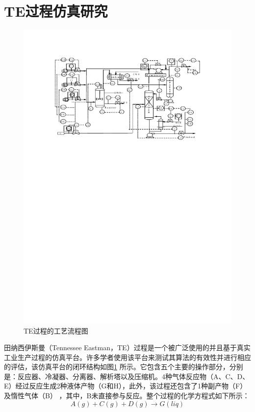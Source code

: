 ﻿\section{TE过程仿真研究}

\begin{figure}[htb]
\centering
\includegraphics{./Pictures/TE.pdf}
\caption{TE过程的工艺流程图}
\label{TE}
\end{figure}
田纳西伊斯曼（Tennessee Eastman，TE）过程是一个被广泛使用的并且基于真实工业生产过程的仿真平台。许多学者使用该平台来测试其算法的有效性并进行相应的评估，该仿真平台的闭环结构如图\ref{TE} 所示。它包含五个主要的操作部分，分别是：反应器、冷凝器、分离器、解析塔以及压缩机。4种气体反应物（A、C、D、E）经过反应生成2种液体产物（G和H），此外，该过程还包含了1种副产物（F）及惰性气体（B） ，其中，B未直接参与反应。整个过程的化学方程式如下所示：
\begin{equation}
A(g)+C(g)+D(g)\rightarrow G(liq)
\end{equation}

